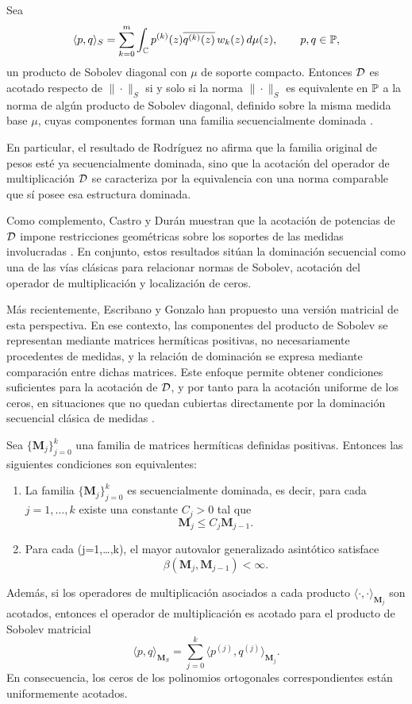\begin{thm}
	\label{thm:rodriguez_dominacion}
	Sea
	\[
		\langle p,q\rangle_S
		=
		\sum_{k=0}^m \int_{\mathbb{C}} p^{(k)}(z)\overline{q^{(k)}(z)}\,w_k(z)\,d\mu(z),
		\qquad p,q\in\mathbb{P},
	\]
	un producto de Sobolev diagonal con \(\mu\) de soporte compacto. Entonces
	\(\mathcal{D}\) es acotado respecto de \(\|\cdot\|_S\) si y solo si la norma
	\(\|\cdot\|_S\) es equivalente en \(\mathbb{P}\) a la norma de algún producto de
	Sobolev diagonal, definido sobre la misma medida base \(\mu\), cuyas
	componentes forman una familia secuencialmente dominada \cite{Rod01}.
\end{thm}

En particular, el resultado de Rodríguez no afirma que la familia original de
pesos esté ya secuencialmente dominada, sino que la acotación del operador de
multiplicación \(\mathcal{D}\) se caracteriza por la equivalencia con una norma
comparable que sí posee esa estructura dominada.

Como complemento, Castro y Durán muestran que la acotación de potencias de
\(\mathcal{D}\) impone restricciones geométricas sobre los soportes de las medidas
involucradas \cite{CastroDuran2003}. En conjunto, estos resultados sitúan la
dominación secuencial como una de las vías clásicas para relacionar normas de
Sobolev, acotación del operador de multiplicación y localización de ceros.

Más recientemente, Escribano y Gonzalo han propuesto una versión matricial de
esta perspectiva. En ese contexto, las componentes del producto de Sobolev se
representan mediante matrices hermíticas positivas, no necesariamente procedentes de medidas, y la relación de dominación se expresa mediante comparación entre dichas matrices. Este enfoque permite obtener condiciones suficientes para la acotación de \(\mathcal{D}\), y por tanto para la acotación uniforme de los ceros, en situaciones que no quedan cubiertas directamente por la dominación secuencial clásica de medidas \cite{EG25}.

\begin{prop}\label{prop:dominacion_matricial_autovalores_intro}
	Sea \(\{\mathbf M_j\}_{j=0}^k\) una familia de matrices hermíticas definidas
	positivas. Entonces las siguientes condiciones son equivalentes:
	\begin{enumerate}
		\item La familia \(\{\mathbf M_j\}_{j=0}^k\) es secuencialmente dominada, es
		      decir, para cada \(j=1,\dots,k\) existe una constante \(C_j>0\) tal que
		      \[
			      \mathbf M_j\leq C_j\mathbf M_{j-1}.
		      \]
		\item Para cada (j=1,\dots,k), el mayor autovalor generalizado asintótico
		      satisface
		      \[
			      \beta(\mathbf M_j,\mathbf M_{j-1})<\infty.
		      \]
	\end{enumerate}
	Además, si los operadores de multiplicación asociados a cada producto
	\(\langle\cdot,\cdot\rangle_{\mathbf M_j}\) son acotados, entonces el operador de
	multiplicación es acotado para el producto de Sobolev matricial
	\[
		\langle p,q\rangle_{\mathbf M_S}
		=
		\sum_{j=0}^k
		\langle p^{(j)},q^{(j)}\rangle_{\mathbf M_j}.
	\]
	En consecuencia, los ceros de los polinomios ortogonales correspondientes están
	uniformemente acotados.
\end{prop}

